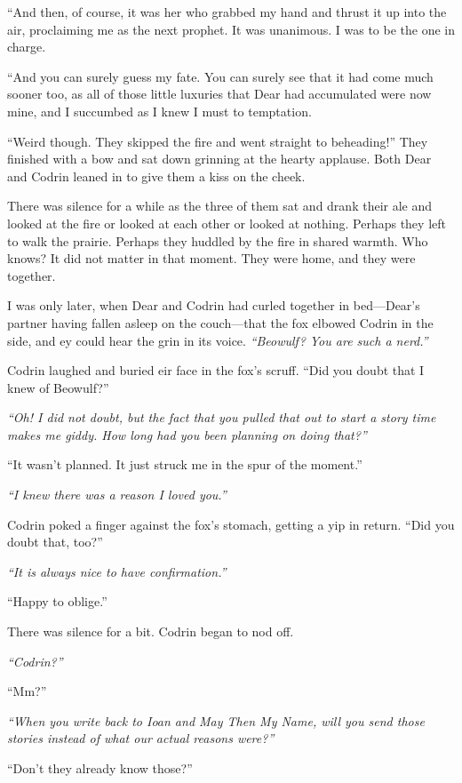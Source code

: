 ``And then, of course, it was her who grabbed my hand and thrust it up into the air, proclaiming me as the next prophet. It was unanimous. I was to be the one in charge.

``And you can surely guess my fate. You can surely see that it had come much sooner too, as all of those little luxuries that Dear had accumulated were now mine, and I succumbed as I knew I must to temptation.

``Weird though. They skipped the fire and went straight to beheading!'' They finished with a bow and sat down grinning at the hearty applause. Both Dear and Codrin leaned in to give them a kiss on the cheek.

There was silence for a while as the three of them sat and drank their ale and looked at the fire or looked at each other or looked at nothing. Perhaps they left to walk the prairie. Perhaps they huddled by the fire in shared warmth. Who knows? It did not matter in that moment. They were home, and they were together.

I was only later, when Dear and Codrin had curled together in bed---Dear's partner having fallen asleep on the couch---that the fox elbowed Codrin in the side, and ey could hear the grin in its voice. \emph{``Beowulf? You are such a nerd.''}

Codrin laughed and buried eir face in the fox's scruff. ``Did you doubt that I knew of Beowulf?''

\emph{``Oh! I did not doubt, but the fact that you pulled that out to start a story time makes me giddy. How long had you been planning on doing that?''}

``It wasn't planned. It just struck me in the spur of the moment.''

\emph{``I knew there was a reason I loved you.''}

Codrin poked a finger against the fox's stomach, getting a yip in return. ``Did you doubt that, too?''

\emph{``It is always nice to have confirmation.''}

``Happy to oblige.''

There was silence for a bit. Codrin began to nod off.

\emph{``Codrin?''}

``Mm?''

\emph{``When you write back to Ioan and May Then My Name, will you send those stories instead of what our actual reasons were?''}

``Don't they already know those?''

